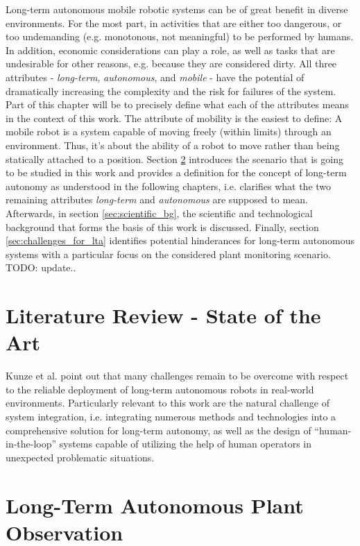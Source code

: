 \documentclass[english, master, utf8]{base/thesis_KBS}
\begin{document}
Long-term autonomous mobile robotic systems can be of great benefit in diverse environments. For the most part, in activities that are either too dangerous,
or too undemanding (e.g. monotonous, not meaningful) to be performed by humans. In addition, economic considerations can play a role, as well as tasks 
that are undesirable for other reasons, e.g. because they are considered dirty.
All three attributes - \textit{long-term}, \textit{autonomous}, and \textit{mobile} - have the potential of dramatically increasing the complexity and
the risk for failures of the system. Part of this chapter will be to precisely define what each of the attributes means in the context of this work.
The attribute of mobility is the easiest to define: A mobile robot is a system capable of moving freely (within limits) through an environment. \cite{Hertzberg:2012}
Thus, it's about the ability of a robot to move rather than being statically attached to a position.
Section \ref{sec:lta_plant_observation} introduces the scenario that is going to be studied in this work and provides a definition for the concept of long-term 
autonomy as understood in the following chapters, i.e. clarifies what the two remaining attributes \textit{long-term} and \textit{autonomous} are supposed to mean.
Afterwards, in section \ref{sec:scientific_bg}, the scientific and technological background that forms the basis of this work is discussed. 
Finally, section \ref{sec:challenges_for_lta} identifies potential hinderances for long-term autonomous systems with a particular focus on the considered plant monitoring scenario.
TODO: update..\newline

\section{Literature Review - State of the Art}
\label{sec:literature_review}

Kunze et al. point out that many challenges remain to be overcome with respect to the reliable deployment of long-term autonomous robots in real-world environments.
Particularly relevant to this work are the natural challenge of system integration, i.e. integrating numerous methods and technologies into a comprehensive solution 
for long-term autonomy, as well as the design of ``human-in-the-loop'' systems capable of utilizing the help of human operators in unexpected problematic situations. \cite{Kunze:2018}

\section{Long-Term Autonomous Plant Observation}
\label{sec:lta_plant_observation}
\end{document}
